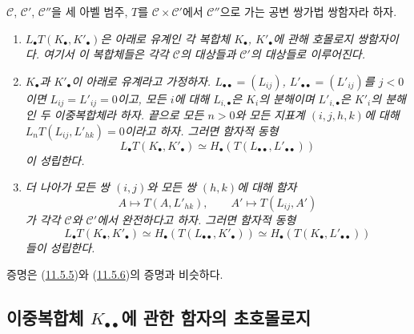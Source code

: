\begin{proposition}[11.6.5]
\label{0.11.6.5-fr}
$\mathcal C$, $\mathcal C'$, $\mathcal C''$을 세 아벨 범주,
$T$를 $\mathcal C\times\mathcal C'$에서 $\mathcal C''$으로 가는
공변 쌍가법 쌍함자라 하자.
\begin{enumerate}
\item[\rm(i)]
\emph{$L_\bullet T(K_\bullet,K'_\bullet)$은 아래로 유계인 각 복합체
$K_\bullet$, $K'_\bullet$에 관해 호몰로지 쌍함자이다. 여기서 이
복합체들은 각각 $\mathcal C$의 대상들과 $\mathcal C'$의 대상들로
이루어진다.}
\item[\rm(ii)]
\emph{$K_\bullet$과 $K'_\bullet$이 아래로 유계라고 가정하자.
$L_{\bullet\bullet}=(L_{ij})$,
$L'_{\bullet\bullet}=(L'_{ij})$를 $j<0$이면
$L_{ij}=L'_{ij}=0$이고, 모든 $i$에 대해 $L_{i,\bullet}$은
$K_i$의 분해이며 $L'_{i,\bullet}$은 $K'_i$의 분해인 두
이중복합체라 하자. 끝으로 모든 $n>0$와 모든 지표계
$(i,j,h,k)$에 대해 $L_nT(L_{ij},L'_{hk})=0$이라고 하자. 그러면
함자적 동형}
\[
\label{0.11.6.5.1-fr}
\tag{11.6.5.1}
L_\bullet T(K_\bullet,K'_\bullet)
\simeq H_\bullet(T(L_{\bullet\bullet},L'_{\bullet\bullet}))
\]
\emph{이 성립한다.}
\item[\rm(iii)]
\emph{더 나아가 모든 쌍 $(i,j)$와 모든 쌍 $(h,k)$에 대해 함자}
\[
A\longmapsto T(A,L'_{hk}),\qquad
A'\longmapsto T(L_{ij},A')
\]
\emph{가 각각 $\mathcal C$와 $\mathcal C'$에서 완전하다고 하자.
그러면 함자적 동형}
\[
\label{0.11.6.5.2-fr}
\tag{11.6.5.2}
L_\bullet T(K_\bullet,K'_\bullet)
\simeq H_\bullet(T(L_{\bullet\bullet},K'_\bullet))
\simeq H_\bullet(T(K_\bullet,L'_{\bullet\bullet}))
\]
\emph{들이 성립한다.}
\end{enumerate}
증명은 (\hyperref[0.11.5.5-ko]{11.5.5})와
(\hyperref[0.11.5.6-ko]{11.5.6})의 증명과 비슷하다.
\end{proposition}

\subsection{이중복합체 $K_{\bullet\bullet}$에 관한 함자의 초호몰로지}
\label{subsection:0.11.7-fr}

